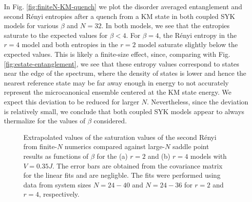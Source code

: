 \documentclass[reprint, floatfix,eqsecnum,superscriptaddress,preprint,nofootinbib,onecolumn,amsmath,amssymb,aps,prb]{revtex4-2}
\begin{document}
In Fig. \ref{fig:finiteN-KM-quench} we plot the disorder averaged entanglement and second R\'enyi entropies after a quench from a KM state in both coupled SYK models for various $\beta$ and $N=32$. 
In both models, we see that the entropies saturate to the expected values for $\beta < 4$. For  $\beta=4$, the R\'enyi entropy in the $r=4$ model and both entropies in the $r=2$ model saturate slightly below the expected values. 
This is likely a finite-size effect, since, comparing with Fig. \ref{fig:estate-entanglement}, we see that these entropy values correspond to states near the edge of the spectrum, where the density of states is lower and hence the nearest reference state may be far away enough in energy to not accurately represent the microcanonical ensemble centered at the KM state energy. We expect this deviation to be reduced for larger $N$. 
Nevertheless, since the deviation is relatively small, we conclude that both coupled SYK models appear to always thermalize for the values of $\beta$ considered.

\begin{figure}%
  \caption{Extrapolated values of the saturation values of the second R\'enyi from finite-$N$ numerics compared against large-$N$ saddle point results as functions of $\beta$ for the (a) $r=2$ and (b) $r=4$ models with $V=0.35J$. The error bars are obtained from the covariance matrix for the linear fits and are negligble. The fits were performed using data from system sizes
  $N=24-40$ and $N=24-36$ for $r=2$ and $r=4$, respectively.
  } \label{fig:finiteN-KM-quench-extrapolation} 
\end{figure}
\end{document}
